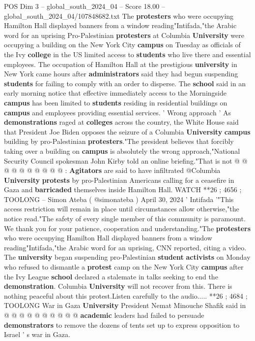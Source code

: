 \begin{textsample}{POS Dim 3 – global\_south\_2024\_04 – Score 18.00 – global\_south\_2024\_04/107848682.txt}  \label{ex:f3_pos_195}
The \textbf{protesters} who were occupying Hamilton Hall displayed banners from a window reading"Intifada,"the Arabic word for an uprising Pro-Palestinian \textbf{protesters} at Columbia \textbf{University} were occupying a building on the New York City \textbf{campus} on Tuesday as officials of the Ivy \textbf{college} in the US limited access to \textbf{students} who live there and essential employees.
The occupation of Hamilton Hall at the prestigious \textbf{university} in New York came hours after \textbf{administrators} said they had begun suspending \textbf{students} for failing to comply with an order to disperse.
The \textbf{school} said in an early morning notice that effective immediately access to the Morningside \textbf{campus} has been limited to \textbf{students} residing in residential buildings on \textbf{campus} and employees providing essential services. ' Wrong approach ' As \textbf{demonstrations} raged at \textbf{colleges} across the country, the White House said that President Joe Biden opposes the seizure of a Columbia \textbf{University} \textbf{campus} building by pro-Palestinian \textbf{protesters}."The president believes that forcibly taking over a building on \textbf{campus} is absolutely the wrong approach,"National Security Council spokesman John Kirby told an online briefing."That is not @ @ @ @ @ @ @ @ @ @ : \textbf{Agitators} are said to have infiltrated @Columbia \textbf{University} \textbf{protests} by pro-Palestinian Americans calling for a ceasefire in Gaza and \textbf{barricaded} themselves inside Hamilton Hall.
WATCH **26 ; 4656 ; TOOLONG -- Simon Ateba ( @simonateba ) April 30, 2024 ' Intifada '"This access restriction will remain in place until circumstances allow otherwise,"the notice read."The safety of every single member of this community is paramount.
We thank you for your patience, cooperation and understanding."The \textbf{protesters} who were occupying Hamilton Hall displayed banners from a window reading"Intifada,"the Arabic word for an uprising, CNN reported, citing a video.
The \textbf{university} began suspending pro-Palestinian \textbf{student} \textbf{activists} on Monday who refused to dismantle a \textbf{protest} camp on the New York City \textbf{campus} after the Ivy League \textbf{school} declared a stalemate in talks seeking to end the \textbf{demonstration}.
Columbia \textbf{University} will not recover from this.
There is nothing peaceful about this protest.Listen carefully to the audio..... **26 ; 4684 ; TOOLONG War in Gaza \textbf{University} President Nemat Minouche Shafik said in @ @ @ @ @ @ @ @ @ @ \textbf{academic} leaders had failed to persuade \textbf{demonstrators} to remove the dozens of tents set up to express opposition to Israel ' s war in Gaza.

\end{textsample}
